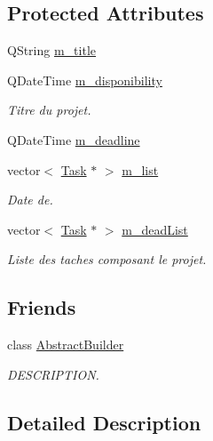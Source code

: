 \subsection*{Protected Attributes}
\begin{DoxyCompactItemize}
\item 
Q\+String \hyperlink{class_project_ac195bf7656682a495a15cc18355daf72}{m\+\_\+title}
\item 
Q\+Date\+Time \hyperlink{class_project_aa1a099bc7b5d5fce04b9f5cf49c86de4}{m\+\_\+disponibility}
\begin{DoxyCompactList}\small\item\em Titre du projet. \end{DoxyCompactList}\item 
Q\+Date\+Time \hyperlink{class_project_a0a6958e225544a4df8e9a772c44fcab9}{m\+\_\+deadline}
\item 
vector$<$ \hyperlink{class_task}{Task} $\ast$ $>$ \hyperlink{class_project_a355bcbeebfa82539904c5febda32085c}{m\+\_\+list}
\begin{DoxyCompactList}\small\item\em Date de. \end{DoxyCompactList}\item 
vector$<$ \hyperlink{class_task}{Task} $\ast$ $>$ \hyperlink{class_project_aa7e880f1492d4d98e4f6a12ef70cc56c}{m\+\_\+dead\+List}
\begin{DoxyCompactList}\small\item\em Liste des taches composant le projet. \end{DoxyCompactList}\end{DoxyCompactItemize}
\subsection*{Friends}
\begin{DoxyCompactItemize}
\item 
class \hyperlink{class_project_a06c624af20d5eed8215dc1c10dce88ab}{Abstract\+Builder}
\begin{DoxyCompactList}\small\item\em D\+E\+S\+C\+R\+I\+P\+T\+I\+O\+N. \end{DoxyCompactList}\end{DoxyCompactItemize}


\subsection{Detailed Description}


